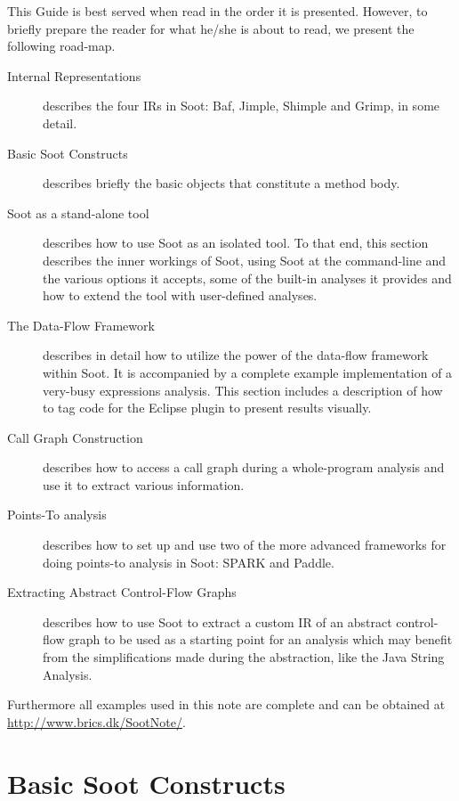 \documentclass{article}
\begin{document}
This Guide is best served when read in the order it is presented.
However, to briefly prepare the reader for what he/she is about to
read, we present the following road-map.
\begin{description}
\item[Internal Representations] describes the four IRs in Soot: Baf,
  Jimple, Shimple and Grimp, in some detail.
\item[Basic Soot Constructs] describes briefly the basic objects that
  constitute a method body.
\item[Soot as a stand-alone tool] describes how to use Soot as an
  isolated tool. To that end, this section describes the inner
  workings of Soot, using Soot at the command-line and the various
  options it accepts, some of the built-in analyses it provides and
  how to extend the tool with user-defined analyses.
\item[The Data-Flow Framework] describes in detail how to utilize the
  power of the data-flow framework within Soot. It is accompanied by a
  complete example implementation of a very-busy expressions
  analysis. This section includes a description of how to tag code for
  the Eclipse plugin to present results visually.
\item[Call Graph Construction] describes how to access a call graph
  during a whole-program analysis and use it to extract various
  information.
\item[Points-To analysis] describes how to set up and use two of the
  more advanced frameworks for doing points-to analysis in Soot: SPARK
  and Paddle.
\item[Extracting Abstract Control-Flow Graphs] describes how to use
  Soot to extract a custom IR of an abstract control-flow graph to be
  used as a starting point for an analysis which may benefit from the
  simplifications made during the abstraction, like the Java String
  Analysis\cite{strings2003}.
\end{description}

Furthermore all examples used in this note are complete and can be
obtained at \url{http://www.brics.dk/SootNote/}.


\section{Basic Soot Constructs}

\end{document}
